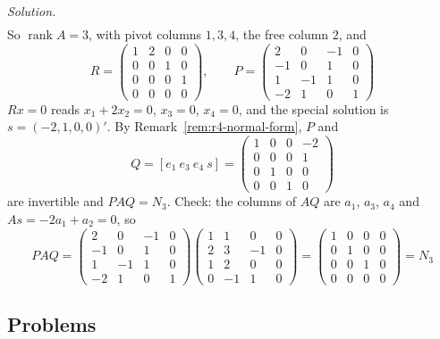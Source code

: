 \documentclass[12pt]{article}
\DeclareMathOperator{\rank}{rank}
\theoremstyle{definition}
\newenvironment{solution}{\par\noindent\textit{Solution.}\ }{\par\smallskip}
\begin{document}
\begin{solution}
\[\begin{gathered}
\end{gathered}
\]
So \(\rank A=3\), with pivot columns \(1,3,4\), the free column \(2\), and
\[
R=\begin{pmatrix}1&2&0&0\\0&0&1&0\\0&0&0&1\\0&0&0&0\end{pmatrix},\qquad
P=\begin{pmatrix}2&0&-1&0\\-1&0&1&0\\1&-1&1&0\\-2&1&0&1\end{pmatrix}
\]
\(Rx=0\) reads \(x_1+2x_2=0\), \(x_3=0\), \(x_4=0\), and the special solution is \(s=(-2,1,0,0)'\). By
Remark~\ref{rem:r4-normal-form}, \(P\) and
\[
Q=[e_1\ e_3\ e_4\ s]=\begin{pmatrix}1&0&0&-2\\0&0&0&1\\0&1&0&0\\0&0&1&0\end{pmatrix}
\]
are invertible and \(PAQ=N_3\). Check: the columns of \(AQ\) are \(a_1\), \(a_3\), \(a_4\) and \(As=-2a_1+a_2=0\), so
\[
PAQ=\begin{pmatrix}2&0&-1&0\\-1&0&1&0\\1&-1&1&0\\-2&1&0&1\end{pmatrix}
\begin{pmatrix}1&1&0&0\\2&3&-1&0\\1&2&0&0\\0&-1&1&0\end{pmatrix}
=\begin{pmatrix}1&0&0&0\\0&1&0&0\\0&0&1&0\\0&0&0&0\end{pmatrix}=N_3
\]
\end{solution}

\subsection*{Problems}
\end{document}
